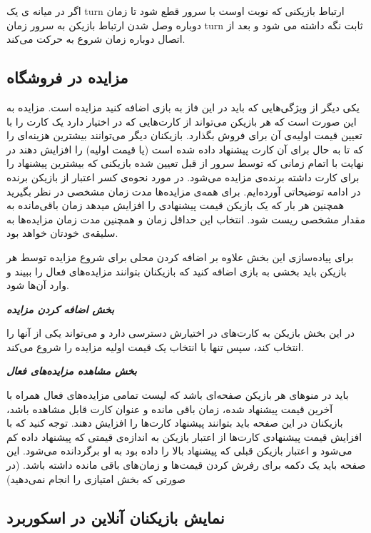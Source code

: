 \documentclass[]{article}
\begin{document}
اگر در میانه ی یک turn ارتباط بازیکنی که نوبت اوست با سرور قطع شود تا زمان دوباره وصل شدن ارتباط بازیکن به سرور زمان turn ثابت نگه داشته می شود و بعد از اتصال دوباره زمان شروع به حرکت می‌کند.


\subsection*{{\titr مزایده در فروشگاه}}

یکی دیگر از ویژگی‌هایی که باید در این فاز به بازی اضافه کنید مزایده است. مزایده به این صورت است که هر بازیکن می‌تواند از کارت‌هایی که در اختیار دارد یک کارت را با تعیین قیمت‌ اولیه‌ی آن برای فروش بگذارد. بازیکنان دیگر می‌توانند بیشترین هزینه‌ای را که تا به حال برای آن کارت پیشنهاد داده شده است (یا قیمت اولیه) را افزایش دهند در نهایت با اتمام زمانی که توسط سرور از قبل تعیین شده بازیکنی که بیشترین پیشنهاد را برای کارت داشته برنده‌ی مزایده می‌شود. در مورد نحوه‌ی کسر اعتبار از بازیکن برنده در ادامه توضیحاتی آورده‌ایم. برای همه‌ی مزایده‌ها مدت زمان مشخصی در نظر بگیرید همچنین هر بار که یک بازیکن قیمت پیشنهادی را افزایش میدهد زمان باقی‌مانده به مقدار مشخصی ریست شود. انتخاب این حداقل زمان و همچنین مدت زمان مزایده‌ها به سلیقه‌ی خودتان خواهد بود.

برای پیاده‌سازی این بخش علاوه بر اضافه کردن محلی برای شروع مزایده توسط هر بازیکن باید بخشی به بازی اضافه کنید که بازیکنان بتوانند مزایده‌های فعال را ببیند و وارد آن‌ها شود.

\textbf{\emph{ بخش اضافه کردن مزایده }}

در این بخش بازیکن به کارت‌های در اختیارش دسترسی دارد و می‌تواند یکی از آنها را انتخاب کند، سپس تنها با انتخاب یک قیمت اولیه مزایده را شروع می‌کند.

\textbf{\emph{ بخش مشاهده مزایده‌های فعال }}

باید در منو‌های هر بازیکن صفحه‌ای باشد که لیست تمامی مزایده‌های فعال همراه با آخرین قیمت پیشنهاد شده، زمان باقی مانده و عنوان کارت قابل مشاهده باشد، بازیکنان در این صفحه باید بتوانند پیشنهاد کارت‌ها را افزایش دهند. توجه کنید که با افزایش قیمت پیشنهادی کارت‌ها از اعتبار بازیکن به اندازه‌ی قیمتی که پیشنهاد داده کم می‌شود و اعتبار بازیکن قبلی که پیشنهاد بالا را داده بود به او برگردانده می‌شود. این صفحه باید یک دکمه برای رفرش کردن قیمت‌ها و زمان‌های باقی مانده داشته باشد. (در صورتی که بخش امتیازی را انجام نمی‌دهید)

\subsection*{{\titr نمایش بازیکنان آنلاین در اسکوربرد}}
\end{document}
